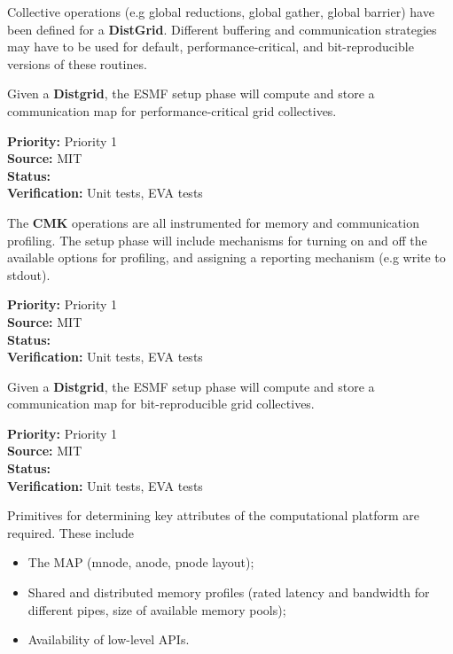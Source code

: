 Collective operations (e.g global reductions, global gather, global
barrier) have been defined for a \textbf{DistGrid}. Different
buffering and communication strategies may have to be used for
default, performance-critical, and bit-reproducible versions of these
routines.


Given a \textbf{Distgrid}, the ESMF setup
phase will compute and store a communication map for
performance-critical grid collectives.

\begin{reqlist}
{\bf Priority:} Priority 1 \\
{\bf Source:}  MIT \\
{\bf Status:}  \\
{\bf Verification:} Unit tests, EVA tests \\
\end{reqlist}


The \textbf{CMK} operations are all instrumented for memory and
communication profiling. The setup phase will include mechanisms for
turning on and off the available options for profiling, and assigning
a reporting mechanism (e.g write to stdout).

\begin{reqlist}
{\bf Priority:} Priority 1 \\
{\bf Source:}  MIT \\
{\bf Status:}  \\
{\bf Verification:} Unit tests, EVA tests \\
\end{reqlist}


Given a \textbf{Distgrid}, the ESMF setup
phase will compute and store a communication map for
bit-reproducible grid collectives.

\begin{reqlist}
{\bf Priority:} Priority 1 \\
{\bf Source:}  MIT \\
{\bf Status:}  \\
{\bf Verification:} Unit tests, EVA tests \\
\end{reqlist}


Primitives for determining key attributes of the computational
platform are required.
These include
\begin{itemize}
\item The MAP (mnode, anode, pnode layout);
\item Shared and distributed memory profiles (rated latency and
  bandwidth for different pipes, size of available memory pools);
\item Availability of low-level APIs.
\end{itemize}

